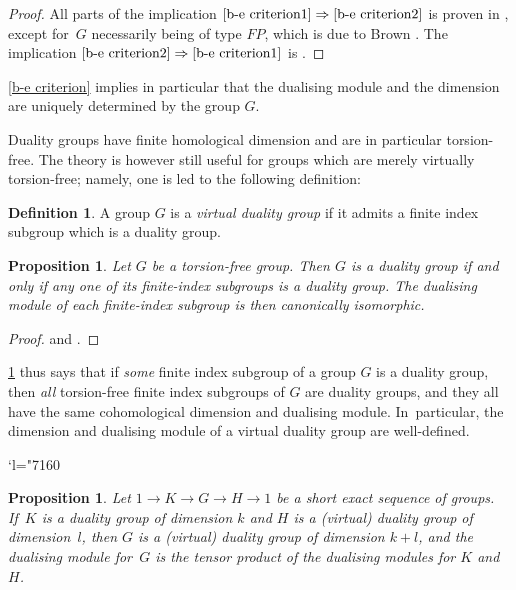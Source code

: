 \documentclass[11pt]{article}
\newcommand{\Changel}{\mathcode`l="7160}
\theoremstyle{plain}
\newtheorem{prop}[thm]{Proposition}
\theoremstyle{definition}
\newtheorem{defn}[thm]{Definition}
\begin{document}
\begin{proof}
All parts of the implication $\eqref{b-e criterion1}\Rightarrow\eqref{b-e criterion2}$ is proven in \cite[\S 1]{be}, except for~$G$ necessarily being of type $\mathit{FP}$, which is due to Brown \cite{brown-finiteness}. The implication $\eqref{b-e criterion2}\Rightarrow\eqref{b-e criterion1}$ is \cite[Th.\,4.5]{be}.
\end{proof}

\cref{b-e criterion} implies in particular that the dualising module and the dimension are uniquely determined by the group $G$.

Duality groups have finite homological dimension and are in particular torsion-free. The theory is however still useful for groups which are merely virtually torsion-free; namely, one is led to the following definition:

\begin{defn}
A group $G$ is a \emph{virtual duality group} if it admits a finite index subgroup which is a duality group.
\end{defn}

\begin{prop}\label{finite index}
Let $G$ be a torsion-free group. Then $G$ is a duality group if and only if any one of its finite-index subgroups is a duality group. The dualising module of each finite-index subgroup is then canonically isomorphic.
\end{prop}

\begin{proof}
\cite[Th.\,3.2]{be} and \cite[Th.\,3.3]{be}.
\end{proof}

\cref{finite index} thus says that if \emph{some} finite index subgroup of a group $G$ is a duality group, then \emph{all} torsion-free finite index subgroups of $G$ are duality groups, and they all have the same cohomological dimension and dualising module. In~particular, the dimension and dualising module of a virtual duality group are well-defined.

\Changel

\begin{prop}\label{prop:SES}
Let $1 \to K \to G \to H \to 1$ be a short exact sequence of groups. If~$K$ is a duality group of dimension $k$ and $H$ is a (virtual) duality group of dimension~$l$, then $G$ is a (virtual) duality group of dimension $k+l$, and the dualising module for~$G$ is the tensor product of the dualising modules for $K$ and $H$.
\end{prop}
\end{document}
